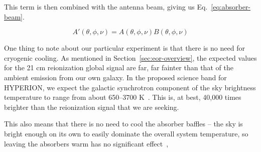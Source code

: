 This term is then combined with the antenna beam, giving us 
Eq.~\eqref{eq:absorber-beam}.

\begin{equation}
    \label{eq:absorber-beam}
    A'(\theta, \phi, \nu) = A(\theta, \phi, \nu) B(\theta, \phi, \nu)
\end{equation}

One thing to note about our particular experiment is that there is no need for 
cryogenic cooling. As mentioned in Section~\ref{sec:eor-overview}, the expected 
values for the 21 cm reionization global signal are far, far fainter than that 
of the ambient emission from our own galaxy. In the proposed science band for 
HYPERION, we expect the galactic synchrotron component of the sky brightness 
temperature to range from about 650--3700 K~\citep{haslam1982}. This is, at 
best, 40,000 times brighter than the reionization signal that we are seeking.

This also means that there is no need to cool the absorber baffles -- the sky 
is bright enough on its own to easily dominate the overall system temperature, 
so leaving the absorbers warm has no significant effect~\citep{kundert2016},
